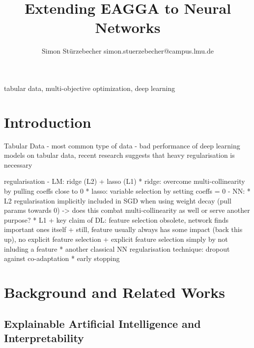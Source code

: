 \documentclass[twoside,11pt]{article}
\begin{document}
\title{Extending EAGGA to Neural Networks}

\author{\name Simon Stürzebecher \email simon.stuerzebecher@campus.lmu.de}


\maketitle

\begin{abstract}%
\end{abstract}

\begin{keywords}
  tabular data, multi-objective optimization, deep learning
\end{keywords}

\section{Introduction}
Tabular Data
- most common type of data
- bad performance of deep learning models on tabular data, recent research suggests that heavy regularisation is necessary

regularisation
- LM: ridge (L2) + lasso (L1)
  * ridge: overcome multi-collinearity by pulling coeffs close to 0
  * lasso: variable selection by setting coeffs = 0
- NN:
  * L2 regularisation implicitly included in SGD when using weight decay (pull params towards 0) -> does this combat multi-collinearity as well or serve another purpose?
  * L1
    + key claim of DL: feature selection obsolete, network finds important ones itself
    + still, feature usually always has some impact (back this up), no explicit feature selection
    + explicit feature selection simply by not inluding a feature
  * another classical NN regularisation technique: dropout against co-adaptation
  * early stopping



\section{Background and Related Works}

\subsection{Explainable Artificial Intelligence and Interpretability}
\end{document}
